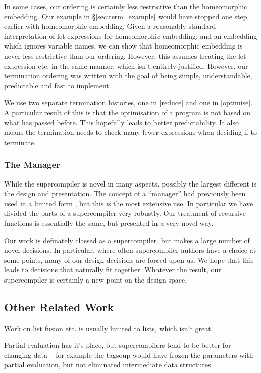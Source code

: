 \documentclass[draft]{sigplanconf}
\begin{document}
In some cases, our ordering is certainly less restrictive than the homeomorphic embedding. Our example in \S\ref{sec:term_example} would have stopped one step earlier with homeomorphic embedding. Given a reasonably standard  interpretation of let expressions for homeomorphic embedding, and an embedding which ignores variable names, we can show that homeomorphic embedding is never less restrictive than our ordering. However, this assumes treating the let expression etc. in the same manner, which isn't entirely justified. However, our termination ordering was written with the goal of being simple, understandable, predictable and fast to implement.

We use two separate termination histories, one in |reduce| and one in |optimise|. A particular result of this is that the optimisation of a program is not based on what has passed before. This hopefully leads to better predictability. It also means the termination needs to check many fewer expressions when deciding if to terminate.

\subsubsection{The Manager}

While the supercompiler is novel in many aspects, possibly the largest different is the design and presentation. The concept of a ``manager'' had previously been used in a limited form \cite{me:ifl2007post}, but this is the most extensive use. In particular we have divided the parts of a supercompiler very robustly. Our treatment of recursive functions is essentially the same, but presented in a very novel way.

Our work is definately classed as a supercompiler, but makes a large number of novel decisions. In particular, where often supercompiler authors have a choice at some points, many of our design decisions are forced upon us. We hope that this leads to decisions that naturally fit together. Whatever the result, our supercompiler is certainly a new point on the design space.

\subsection{Other Related Work}


Work on list fusion etc. is usually limited to lists, which isn't great.

Partial evaluation has it's place, but supercompilers tend to be better for changing data -- for example the tagsoup would have frozen the parameters with partial evaluation, but not eliminated intermediate data structures.
\end{document}

